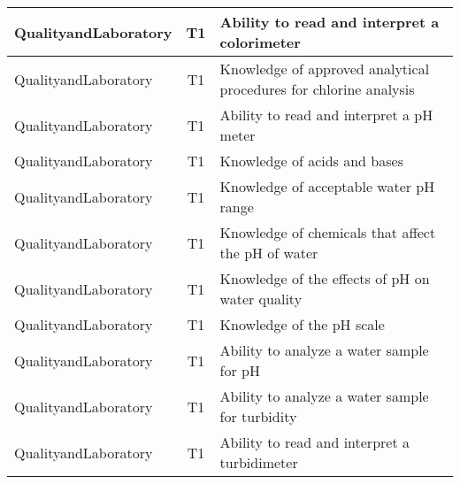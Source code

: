 \documentclass{article}
\begin{document}
\begin{table}[]
\begin{tabular}{|l|c|l|}
QualityandLaboratory                   & T1             & Ability to read and   interpret a colorimeter                                                                                     \\ \hline
QualityandLaboratory                   & T1             & Knowledge of approved   analytical procedures for chlorine analysis                                                               \\ \hline
QualityandLaboratory                   & T1             & Ability to read and   interpret a pH meter                                                                                        \\ \hline
QualityandLaboratory                   & T1             & Knowledge of acids   and bases                                                                                                    \\ \hline
QualityandLaboratory                   & T1             & Knowledge of   acceptable water pH range                                                                                          \\ \hline
QualityandLaboratory                   & T1             & Knowledge of   chemicals that affect the pH of water                                                                              \\ \hline
QualityandLaboratory                   & T1             & Knowledge of the   effects of pH on water quality                                                                                 \\ \hline
QualityandLaboratory                   & T1             & Knowledge of the pH   scale                                                                                                       \\ \hline
QualityandLaboratory                   & T1             & Ability to analyze a   water sample for pH                                                                                        \\ \hline
QualityandLaboratory                   & T1             & Ability to analyze a   water sample for turbidity                                                                                 \\ \hline
QualityandLaboratory                   & T1             & Ability to read and   interpret a turbidimeter                                                                                    \\ \hline

\end{tabular}
\end{table}
\end{document}

